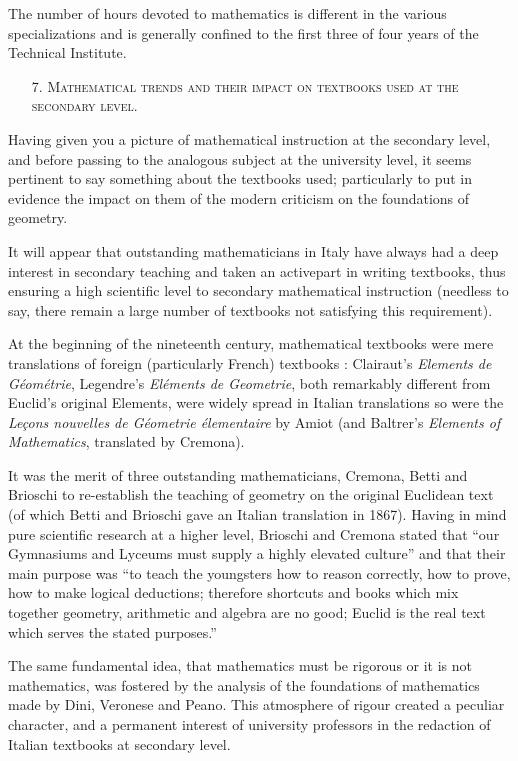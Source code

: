 The number of hours devoted to mathematics is different in the various specializations and is generally confined to the first three of four years of the Technical Institute.

\begin{itemize}
\item[7.] \textsc{Mathematical trends and their impact on textbooks used at the secondary level.}
\end{itemize}

Having given you a picture of mathematical instruction at the secondary level, and before passing to the analogous subject at the university level, it seems pertinent to say something about the textbooks used; particularly to put in evidence the impact on them of the modern criticism on the foundations of geometry.

It will appear that outstanding mathematicians in Italy have always had a deep interest in secondary teaching and taken an active\pageoriginale part in writing textbooks, thus ensuring a high scientific level to secondary mathematical instruction (needless to say, there remain a large number of textbooks not satisfying this requirement).

At the beginning of the nineteenth century, mathematical textbooks were mere translations of foreign (particularly French) textbooks : Clairaut's {\em Elements de G\'eom\'etrie}, Legendre's {\em El\'ements de Geometrie}, both remarkably different from Euclid's original Elements, were widely spread in Italian translations so were the {\em Le\c{c}ons nouvelles de G\'eometrie \'elementaire} by Amiot (and Baltrer's {\em Elements of Mathematics}, translated by Cremona).

It was the merit of three outstanding mathematicians, Cremona, Betti and Brioschi to re-establish the teaching of geometry on the original Euclidean text (of which Betti and Brioschi gave an Italian translation in 1867). Having in mind pure scientific research at a higher level, Brioschi and Cremona stated that ``our Gymnasiums and Lyceums must supply a highly elevated culture'' and that their main purpose was ``to teach the youngsters how to reason correctly, how to prove, how to make logical deductions; therefore shortcuts and books which mix together geometry, arithmetic and algebra are no good; Euclid is the real text which serves the stated purposes.''

The same fundamental idea, that mathematics must be rigorous or it is not mathematics, was fostered by the analysis of the foundations of mathematics made by Dini, Veronese and Peano. This atmosphere of rigour created a peculiar character, and a permanent interest of university professors in the redaction of Italian textbooks at secondary level.

